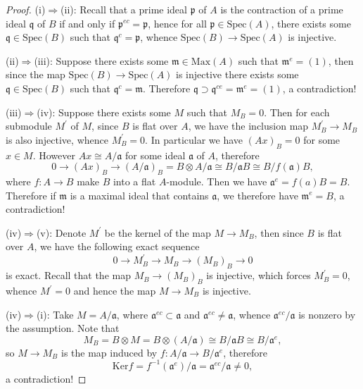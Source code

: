 \begin{proof}
(i)$\Rightarrow$(ii): Recall that a prime ideal $\mathfrak{p}$ of $A$ is the contraction of a prime ideal $\mathfrak{q}$ of $B$ if and only if $\mathfrak{p}^{ec}=\mathfrak{p}$, hence for all $\mathfrak{p}\in\mathrm{Spec}(A)$, there exists some $\mathfrak{q}\in\mathrm{Spec}(B)$ such that $\mathfrak{q}^c=\mathfrak{p}$, whence $\mathrm{Spec}(B)\to\mathrm{Spec}(A)$ is injective.\par
(ii)$\Rightarrow$(iii): Suppose there exists some $\mathfrak{m}\in\mathrm{Max}(A)$ such that $\mathfrak{m}^e=(1)$, then since the map $\mathrm{Spec}(B)\to\mathrm{Spec}(A)$ is injective there exists some $\mathfrak{q}\in\mathrm{Spec}(B)$ such that $\mathfrak{q}^c=\mathfrak{m}$. Therefore $\mathfrak{q}\supset\mathfrak{q}^{ce}=\mathfrak{m}^e=(1)$, a contradiction!\par
(iii)$\Rightarrow$(iv): Suppose there exists some $M$ such that $M_B=0$. Then for each submodule $M^\prime$ of $M$, since $B$ is flat over $A$, we have the inclusion map $M_B^\prime\to M_B$ is also injective, whence $M_B^\prime=0$. In particular we have $(Ax)_B=0$ for some $x\in M$. However $Ax\cong A/\mathfrak{a}$ for some ideal $\mathfrak{a}$ of $A$, therefore 
$$
0\longrightarrow \left( Ax \right) _B\longrightarrow \left( A/\mathfrak{a} \right) _B=B\otimes A/\mathfrak{a} \cong B/\mathfrak{a} B\cong B/f\left( \mathfrak{a} \right) B,
$$
where $f:A\to B$ make $B$ into a flat $A$-module. Then we have $\mathfrak{a}^e=f(a)B=B$. Therefore if $\mathfrak{m}$ is a maximal ideal that contains $\mathfrak{a}$, we therefore have $\mathfrak{m}^e=B$, a contradiction!\par
(iv)$\Rightarrow$(v): Denote $M^\prime$ be the kernel of the map $M\to M_B$, then since $B$ is flat over $A$, we have the following exact sequence 
$$
0\longrightarrow M_{B}^{\prime}\longrightarrow M_B\longrightarrow \left( M_B \right) _B\longrightarrow 0
$$
is exact. Recall that the map $M_B\to (M_B)_B$ is injective, which forces $M_B^\prime=0$, whence $M^\prime=0$ and hence the map $M\to M_B$ is injective.\par
(iv)$\Rightarrow$(i): Take $M=A/\mathfrak{a}$, where $\mathfrak{a}^{ec}\subset\mathfrak{a}$ and $\mathfrak{a}^{ec}\ne\mathfrak{a}$, whence $\mathfrak{a}^{ec}/\mathfrak{a}$ is nonzero by the assumption. Note that 
$$
M_B=B\otimes M=B\otimes \left( A/\mathfrak{a} \right) \cong B/\mathfrak{a} B\cong B/\mathfrak{a} ^e,
$$
so $M\to M_B$ is the map induced by $f:A/\mathfrak{a}\to B/\mathfrak{a}^e$, therefore 
$$
\mathrm{Ker} f =f^{-1}\left( \mathfrak{a} ^e \right) /\mathfrak{a} =\mathfrak{a} ^{ec}/\mathfrak{a} \ne 0,
$$
a contradiction!
\end{proof}

